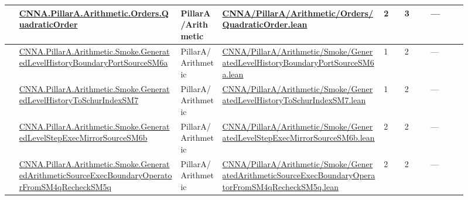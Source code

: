 \begin{longtable}{L{0.025\linewidth} L{0.315\linewidth} L{0.08\linewidth} L{0.315\linewidth} L{0.045\linewidth} L{0.055\linewidth} L{0.07\linewidth}}
\hline
{} & \href{run:repo_snapshot/CNNA/PillarA/Arithmetic/Orders/QuadraticOrder.lean}{CNNA.\allowbreak{}PillarA.\allowbreak{}Arithmetic.\allowbreak{}Orders.\allowbreak{}QuadraticOrder} & PillarA/\allowbreak{}Arithmetic & \href{run:repo_snapshot/CNNA/PillarA/Arithmetic/Orders/QuadraticOrder.lean}{CNNA/\allowbreak{}PillarA/\allowbreak{}Arithmetic/\allowbreak{}Orders/\allowbreak{}QuadraticOrder.\allowbreak{}lean} & 2 & 3 & ---\\
\hline
{} & \href{run:repo_snapshot/CNNA/PillarA/Arithmetic/Smoke/GeneratedLevelHistoryBoundaryPortSourceSM6a.lean}{CNNA.\allowbreak{}PillarA.\allowbreak{}Arithmetic.\allowbreak{}Smoke.\allowbreak{}GeneratedLevelHistoryBoundaryPortSourceSM6a} & PillarA/\allowbreak{}Arithmetic & \href{run:repo_snapshot/CNNA/PillarA/Arithmetic/Smoke/GeneratedLevelHistoryBoundaryPortSourceSM6a.lean}{CNNA/\allowbreak{}PillarA/\allowbreak{}Arithmetic/\allowbreak{}Smoke/\allowbreak{}GeneratedLevelHistoryBoundaryPortSourceSM6a.\allowbreak{}lean} & 1 & 2 & ---\\
\hline
{} & \href{run:repo_snapshot/CNNA/PillarA/Arithmetic/Smoke/GeneratedLevelHistoryToSchurIndexSM7.lean}{CNNA.\allowbreak{}PillarA.\allowbreak{}Arithmetic.\allowbreak{}Smoke.\allowbreak{}GeneratedLevelHistoryToSchurIndexSM7} & PillarA/\allowbreak{}Arithmetic & \href{run:repo_snapshot/CNNA/PillarA/Arithmetic/Smoke/GeneratedLevelHistoryToSchurIndexSM7.lean}{CNNA/\allowbreak{}PillarA/\allowbreak{}Arithmetic/\allowbreak{}Smoke/\allowbreak{}GeneratedLevelHistoryToSchurIndexSM7.\allowbreak{}lean} & 1 & 2 & ---\\
\hline
{} & \href{run:repo_snapshot/CNNA/PillarA/Arithmetic/Smoke/GeneratedLevelStepExecMirrorSourceSM6b.lean}{CNNA.\allowbreak{}PillarA.\allowbreak{}Arithmetic.\allowbreak{}Smoke.\allowbreak{}GeneratedLevelStepExecMirrorSourceSM6b} & PillarA/\allowbreak{}Arithmetic & \href{run:repo_snapshot/CNNA/PillarA/Arithmetic/Smoke/GeneratedLevelStepExecMirrorSourceSM6b.lean}{CNNA/\allowbreak{}PillarA/\allowbreak{}Arithmetic/\allowbreak{}Smoke/\allowbreak{}GeneratedLevelStepExecMirrorSourceSM6b.\allowbreak{}lean} & 2 & 2 & ---\\
\hline
{} & \href{run:repo_snapshot/CNNA/PillarA/Arithmetic/Smoke/GeneratedArithmeticSourceExecBoundaryOperatorFromSM4qRecheckSM5q.lean}{CNNA.\allowbreak{}PillarA.\allowbreak{}Arithmetic.\allowbreak{}Smoke.\allowbreak{}GeneratedArithmeticSourceExecBoundaryOperatorFromSM4qRecheckSM5q} & PillarA/\allowbreak{}Arithmetic & \href{run:repo_snapshot/CNNA/PillarA/Arithmetic/Smoke/GeneratedArithmeticSourceExecBoundaryOperatorFromSM4qRecheckSM5q.lean}{CNNA/\allowbreak{}PillarA/\allowbreak{}Arithmetic/\allowbreak{}Smoke/\allowbreak{}GeneratedArithmeticSourceExecBoundaryOperatorFromSM4qRecheckSM5q.\allowbreak{}lean} & 2 & 2 & ---\\

\end{longtable}
